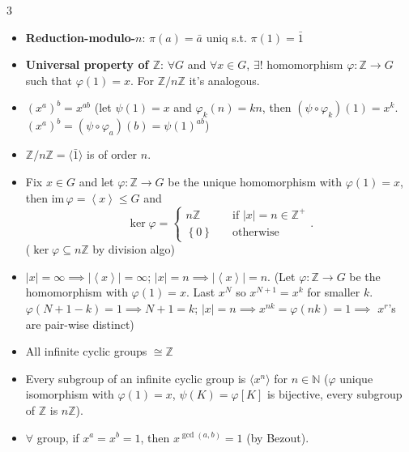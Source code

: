 \documentclass[10pt]{article}
\newcommand{\N}{\mathbb{N}} %
\newcommand{\Z}{\mathbb{Z}} %
\newcommand{\abs}[1]{\left\lvert#1\right\rvert} %
\begin{document}
\begin{multicols*}{3}
\begin{itemize}
            \item \textbf{Reduction-modulo-$n$}: $\pi\left(a\right) = \bar{a}$ uniq s.t. $\pi\left(1\right) = \bar{1}$
            \item \textbf{Universal property of $\Z$}: $\forall G$ and $\forall x \in G$, $\exists!$ homomorphism $\varphi \colon \Z \to G$ such that $\varphi\left(1\right) = x$.  For $\Z \slash n\Z$ it's analogous.
            \item $\left(x^a\right)^b = x^{ab}$ (let $\psi\left(1\right) = x$ and $\varphi_k\left(n\right) = kn$, then $\left(\psi \circ \varphi_k\right)\left(1\right) = x^k$. $\left(x^a\right)^b = \left(\psi \circ \varphi_a\right)\left(b\right) = \psi\left(1\right)^{ab}$)
            \item $\Z \slash n\Z = \langle\bar{1}\rangle$ is of order $n$.
            \item Fix $x \in G$ and let $\varphi \colon \Z \to G$ be the unique homomorphism with $\varphi\left(1\right) = x$, then $\mathrm{im}\,{\varphi} = \left\langle x \right\rangle \leq G$ and 
            \begin{equation*}
                \ker{\varphi} = \begin{cases}
                    n\Z & \quad\textrm{if } \abs{x} = n \in \Z^+ \\
                    \left\{0\right\} & \quad\textrm{otherwise}
                \end{cases}.
            \end{equation*}
            ($\ker{\varphi} \subseteq n\Z$ by division algo)
            \item $\abs{x} = \infty \implies\abs{\left\langle x \right\rangle} = \infty$; $\abs{x} = n \implies \abs{\left\langle x \right\rangle} = n$. (Let $\varphi \colon \Z \to G$ be the homomorphism with $\varphi\left(1\right) = x$. Last $x^N$ so $x^{N + 1} = x^k$ for smaller $k$. $\varphi\left(N + 1 - k\right) = 1 \implies N + 1 = k$; $\abs{x} = n \implies x^{nk} = \varphi\left(nk\right) = 1 \implies$ $x^r$'s are pair-wise distinct)
            \item All infinite cyclic groups $\cong \Z$
            \item Every subgroup of an infinite cyclic group is $\langle x^n \rangle$ for $n \in \N$ ($\varphi$ unique isomorphism with $\varphi\left(1\right) = x$, $\psi\left(K\right) = \varphi\left[K\right]$ is bijective, every subgroup of $\Z$ is $n\Z$).
            \item $\forall$ group, if $x^a = x^b = 1$, then $x^{\gcd\left(a, b\right)} = 1$ (by Bezout). 

\end{itemize}
\end{multicols*}
\end{document}
